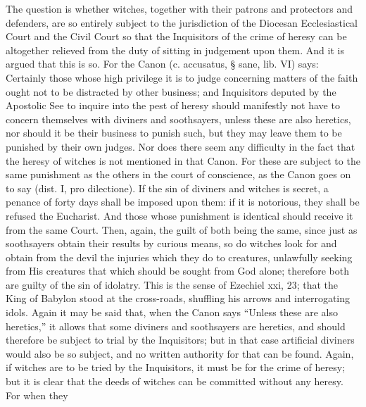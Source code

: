 
             The question is whether witches, together with their patrons and protectors and
       defenders, are so entirely subject to the jurisdiction of the Diocesan Ecclesiastical Court and
       the Civil Court so that the Inquisitors of the crime of heresy can be altogether relieved from
       the duty of sitting in judgement upon them. And it is argued that this is so. For the Canon (c.
       accusatus, § sane, lib. VI) says: Certainly those whose high privilege it is to judge
       concerning matters of the faith ought not to be distracted by other business; and Inquisitors
       deputed by the Apostolic See to inquire into the pest of heresy should manifestly not have to
       concern themselves with diviners and soothsayers, unless these are also heretics, nor should
       it be their business to punish such, but they may leave them to be punished by their own
       judges.
             Nor does there seem any difficulty in the fact that the heresy of witches is not
       mentioned in that Canon. For these are subject to the same punishment as the others in the
       court of conscience, as the Canon goes on to say (dist. I, pro dilectione). If the sin of
       diviners and witches is secret, a penance of forty days shall be imposed upon them: if it is
       notorious, they shall be refused the Eucharist. And those whose punishment is identical
       should receive it from the same Court. Then, again, the guilt of both being the same, since
       just as soothsayers obtain their results by curious means, so do witches look for and obtain
       from the devil the injuries which they do to creatures, unlawfully seeking from His creatures
       that which should be sought from God alone; therefore both are guilty of the sin of idolatry.
             This is the sense of Ezechiel xxi, 23; that the King of Babylon stood at the cross-roads,
       shuffling his arrows and interrogating idols.
             Again it may be said that, when the Canon says “Unless these are also heretics,” it
       allows that some diviners and soothsayers are heretics, and should therefore be subject to
       trial by the Inquisitors; but in that case artificial diviners would also be so subject, and no
       written authority for that can be found.
             Again, if witches are to be tried by the Inquisitors, it must be for the crime of heresy;
       but it is clear that the deeds of witches can be committed without any heresy. For when they
